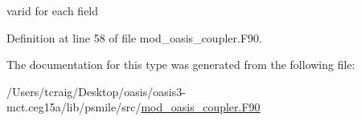varid for each field 



Definition at line 58 of file mod\+\_\+oasis\+\_\+coupler.\+F90.



The documentation for this type was generated from the following file\+:\begin{DoxyCompactItemize}
\item 
/\+Users/tcraig/\+Desktop/oasis/oasis3-\/mct.\+ceg15a/lib/psmile/src/\hyperlink{mod__oasis__coupler_8_f90}{mod\+\_\+oasis\+\_\+coupler.\+F90}\end{DoxyCompactItemize}
